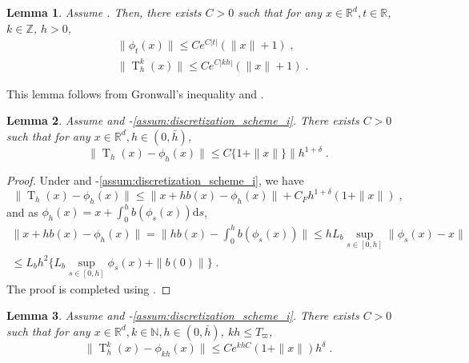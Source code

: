 \documentclass{article}
\newtheorem{lemma}[lemma]{Lemma}
\def\transfo{\operatorname{T}}
\def\rmd{\operatorname{d}\hspace{-2pt}}
\def\rset{\mathbb{R}}
\def\nset{\mathbb{N}}
\def\rmd{\mathrm{d}}
\def\eqsp{\,}
\def\eqsp{\;}
\newcommand{\ooint}[1]{\left(#1\right)}
\newcommand{\1}{\mathds{1}}
\def\rset{\mathbb{R}}
\def\zset{\mathbb{Z}}
\def\nset{\mathbb{N}}
\def\rmd{\mathrm{d}}
\def\Tvarpi{T_\varpi}
\begin{document}
\begin{lemma}
  \label{lem:gronwall}
  Assume .
  Then, there exists $C>0$ such that  for any $x\in\rset^d, t\in\rset$, $k\in\zset$, $h>0$,
  \begin{align*}
      &\|\phi_t(x)\|\leq C e^{C|t|}(\|x\|+1)\eqsp,
      \\&\|\transfo_h^k(x)\|\leq C e^{C|kh|}(\|x\|+1)\eqsp.
  \end{align*}
  \end{lemma}
  This lemma follows from Gronwall's inequality and .
 \begin{lemma}
  \label{lemma:control_discretization_1}
 Assume   and -\ref{assum:discretization_scheme_i}. There exists $C>0$ such that for any $x\in\rset^d, h\in\ooint{0, \bar{h}}$,
 \begin{equation}
 \label{eq:control_discretization_1}
      \|\transfo_h(x) -\phi_h(x)\| \leq C \{1+\|x\|\}\|h^{1+\delta}\eqsp.
 \end{equation}
 \end{lemma}
 \begin{proof}
  Under    and
 -\ref{assum:discretization_scheme_i}, we have
  \begin{equation*}
      \|\transfo_h(x) -\phi_h(x)\| \leq \| x+hb(x) - \phi_h(x)\| + C_Fh^{1+\delta}(1+\|x\|)\eqsp,
  \end{equation*}
  and as $\phi_h(x) = x + \int_0^hb(\phi_s(x))\rmd s$,
  \begin{multline} 
  \textstyle \| x+hb(x) - \phi_h(x)\| = \|hb(x) - \int_0^hb(\phi_s(x))\|\leq h L_b \sup_{s\in[0,h]}\|\phi_s(x) - x\|\\ \leq L_b h^2\{L_b \sup_{s\in[0,h]}\phi_s(x) + \|b(0)\|\}\eqsp.
  \end{multline}
The proof is completed using .
  \end{proof}
   \begin{lemma}
  \label{lemma:control_discretization}
 Assume   and -\ref{assum:discretization_scheme_i}. There exists $C>0$ such that for any $x\in\rset^d, k\in\nset, h\in\ooint{0, \bar{h}}$, $kh\leq \Tvarpi$,
 \begin{equation}
 \label{eq:control_discretization}
     \|\transfo_h ^k(x) - \phi_{kh}(x)\| \leq C e^{khC} (1+\|x\|)h^{\delta}\eqsp.
 \end{equation}
 \end{lemma}
\end{document}
